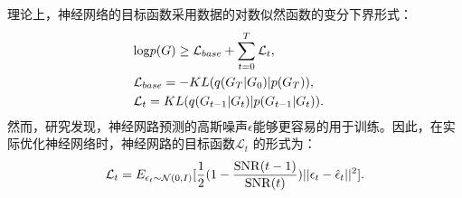 理论上，神经网络的目标函数采用数据的对数似然函数的变分下界形式：
\begin{eqnarray}
    &{\rm log}p(G) \geq \mathcal{L}_{base} + \sum_{t=0}^T \mathcal{L}_t,& \\
    &\mathcal{L}_{base} = -KL(q(G_T|G_0)|p(G_T)),& \\
    &\mathcal{L}_t = KL(q(G_{t-1}|G_t)|p(G_{t-1}|G_t)). &
\end{eqnarray}
然而，研究发现，神经网路预测的高斯噪声$\epsilon$能够更容易的用于训练。因此，在实际优化神经网络时，神经网路的目标函数$\mathcal{L}_t$ \cite{vaediff_kingma_21}的形式为：
\begin{equation}
    \mathcal{L}_t = E_{\epsilon_t \sim \mathcal{N}(0, I)}[\frac{1}{2}(1- \frac{{\rm SNR}(t-1)}{{\rm SNR}(t)})||\epsilon_t - \hat{\epsilon}_t||^2].
\end{equation}

